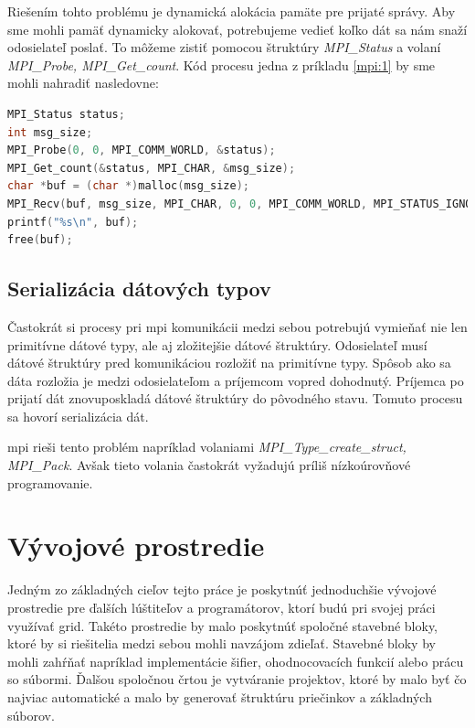 Riešením tohto problému je dynamická alokácia pamäte pre prijaté správy. Aby sme mohli pamäť dynamicky alokovať, potrebujeme vedieť
koľko dát sa nám snaží odosielateľ poslať. To môžeme zistiť pomocou štruktúry \textit{MPI\_Status} a volaní \textit{MPI\_Probe, MPI\_Get\_count}.
Kód procesu jedna z príkladu \ref{mpi:1} by sme mohli nahradiť nasledovne:
\begin{lstlisting}[language=c]
MPI_Status status;
int msg_size;
MPI_Probe(0, 0, MPI_COMM_WORLD, &status);
MPI_Get_count(&status, MPI_CHAR, &msg_size);
char *buf = (char *)malloc(msg_size);
MPI_Recv(buf, msg_size, MPI_CHAR, 0, 0, MPI_COMM_WORLD, MPI_STATUS_IGNORE);
printf("%s\n", buf);
free(buf);
\end{lstlisting}

\subsection{Serializácia dátových typov}
\label{kap:serialize}
Častokrát si procesy pri \acrshort{mpi} komunikácii medzi sebou potrebujú vymieňať nie len primitívne dátové typy, ale aj zložitejšie dátové štruktúry.
Odosielateľ musí dátové štruktúry pred komunikáciou rozložiť na primitívne typy. Spôsob ako sa dáta rozložia je medzi odosielateľom a príjemcom vopred dohodnutý.
Príjemca po prijatí dát znovuposkladá dátové štruktúry do pôvodného stavu. Tomuto procesu sa hovorí serializácia dát.

\acrshort{mpi} rieši tento problém napríklad volaniami \textit{MPI\_Type\_create\_struct, MPI\_Pack}.
Avšak tieto volania častokrát vyžadujú príliš nízkoúrovňové programovanie.


\section{Vývojové prostredie}
Jedným zo základných cieľov tejto práce je poskytnúť jednoduchšie vývojové prostredie pre ďalších lúštiteľov a programátorov,
ktorí budú pri svojej práci využívať grid.
Takéto prostredie by malo poskytnúť spoločné stavebné bloky, ktoré by si riešitelia medzi sebou mohli navzájom zdieľať.
Stavebné bloky by mohli zahŕňať napríklad implementácie šifier, ohodnocovacích funkcií alebo prácu so súbormi.
Ďalšou spoločnou črtou je vytváranie projektov, ktoré by malo byť čo najviac automatické a malo by generovať štruktúru priečinkov a základných súborov.

